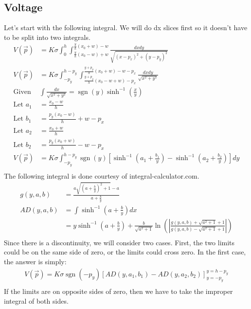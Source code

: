 \documentclass{article}
\begin{document}
\subsection{Voltage}
Let's start with the following integral. We will do dx slices first so it doesn't have to be split into two integrals.
\begin{align*}
V(\vec{p}) &= K\sigma\int_0^h \int_{\frac{y}{h}(x_0-w)+w}^{\frac{y}{h}(x_0+w)-w} \frac{dxdy}{\sqrt{(x-p_x)^2+(y-p_y)^2}}\\
V(\vec{p}) &= K\sigma\int_{-p_y}^{h-p_y} \int_{\frac{y+p_y}{h}(x_0-w+w)-p_x}^{\frac{y+p_y}{h}(x_0+w)-w-p_x} \frac{dxdy}{\sqrt{x^2+y^2}}\\
\text{Given } &\int \frac{dx}{\sqrt{x^2+y^2}} = \operatorname{sgn}(y)\operatorname{sinh}^{-1}\left(\frac{x}{y}\right) \\
\text{Let } a_1 &= \frac{x_0-w}{h}\\
\text{Let } b_1 &= \frac{p_y(x_0-w)}{h}+w-p_x\\
\text{Let } a_2 &= \frac{x_0+w}{h}\\
\text{Let } b_2 &= \frac{p_y(x_0+w)}{h}-w-p_x\\
V(\vec{p}) &= K\sigma\int_{-p_y}^{h-p_y} \operatorname{sgn}(y)\left[\operatorname{sinh}^{-1}\left(a_1+\frac{b_1}{y}\right)-\operatorname{sinh}^{-1}\left(a_2+\frac{b_2}{y}\right)\right]dy\\
\end{align*}
The following integral is done courtesy of integral-calculator.com.
\begin{align*}
g(y,a,b) &= \frac{a\sqrt{\left(a+\frac{b}{y}\right)^2+1}-a}{a+\frac{b}{y}}\\
AD(y,a,b) &= \int \operatorname{sinh}^{-1}\left(a+\frac{b}{y}\right)dx\\
&= y\operatorname{sinh}^{-1}\left(a+\frac{b}{y}\right)+\frac{b}{\sqrt{a^2+1}}\ln\left(\left|\frac{g(y,a,b)+\sqrt{a^2+1}+1}{g(y,a,b)-\sqrt{a^2+1}+1}\right|\right) \\
\end{align*}
Since there is a discontinuity, we will consider two cases. First, the two limits could be on the same side of zero, or the limits could cross zero. In the first case, the answer is simply:
\begin{align*}
    V(\vec{p}) = K\sigma\operatorname{sgn}(-p_y)\left[AD(y,a_1,b_1)-AD(y,a_2,b_2)\right]_{y=-p_y}^{y=h-p_y}\\
\end{align*}
If the limits are on opposite sides of zero, then we have to take the improper integral of both sides.
\end{document}
